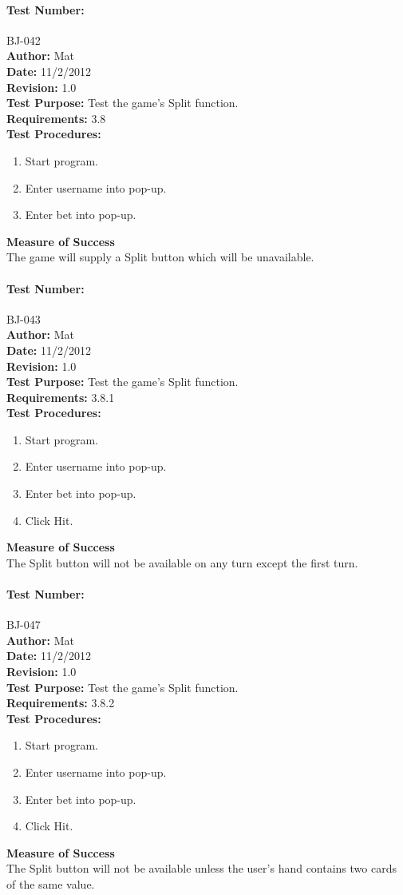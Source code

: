 \documentclass{article}
\begin{document}
\paragraph{Test Number:} BJ-042\\
\textbf{Author:} Mat\\
\textbf{Date:} 11/2/2012\\
\textbf{Revision:} 1.0\\
\textbf{Test Purpose:} Test the game's Split function.\\
\textbf{Requirements:} 3.8 \\
\textbf{Test Procedures:} 
\begin{enumerate}
\item Start program.
\item Enter username into pop-up.
\item Enter bet into pop-up.
\end{enumerate}
\textbf{Measure of Success}\\The game will supply a Split button which will be unavailable.
\paragraph{Test Number:} BJ-043\\
\textbf{Author:} Mat\\
\textbf{Date:} 11/2/2012\\
\textbf{Revision:} 1.0\\
\textbf{Test Purpose:} Test the game's Split function.\\
\textbf{Requirements:} 3.8.1 \\
\textbf{Test Procedures:} 
\begin{enumerate}
\item Start program.
\item Enter username into pop-up.
\item Enter bet into pop-up.
\item Click Hit.
\end{enumerate}
\textbf{Measure of Success}\\The Split button will not be available on any turn except the first turn.
\paragraph{Test Number:} BJ-047\\
\textbf{Author:} Mat\\
\textbf{Date:} 11/2/2012\\
\textbf{Revision:} 1.0\\
\textbf{Test Purpose:} Test the game's Split function.\\
\textbf{Requirements:} 3.8.2 \\
\textbf{Test Procedures:} 
\begin{enumerate}
\item Start program.
\item Enter username into pop-up.
\item Enter bet into pop-up.
\item Click Hit.
\end{enumerate}
\textbf{Measure of Success}\\The Split button will not be available unless the user's hand contains two cards of the same value.
\end{document}

